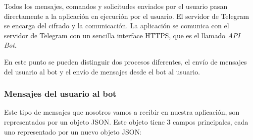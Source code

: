 \documentclass[10pt,journal,compsoc]{IEEEtran}
\begin{document}
Todos los mensajes, comandos y solicitudes enviados por el usuario pasan 
directamente a la aplicación en ejecución por el usuario. El servidor de 
Telegram se encarga del cifrado y la comunicación. La aplicación se comunica con 
el servidor de Telegram con un sencilla interface HTTPS, que es el llamado \textit{API 
Bot}.

En este punto se pueden distinguir dos procesos diferentes, el envío de mensajes 
del usuario al bot y el envío de mensajes desde el bot al usuario.

\subsubsection{Mensajes del usuario al bot}
Este tipo de mensajes que nosotros vamos a recibir en nuestra aplicación, son 
representados por un objeto JSON. Este objeto tiene 3 campos principales, cada uno representado por
un nuevo objeto JSON:
\end{document}
